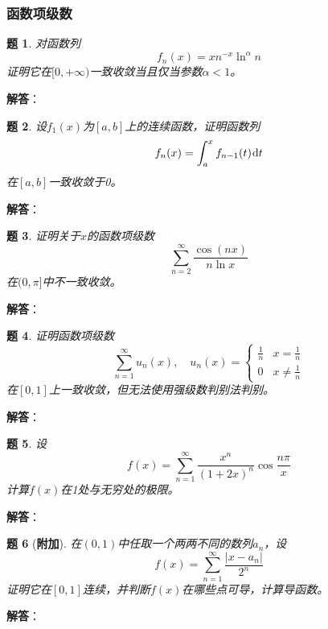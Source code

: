 \documentclass[a4paper,UTF8,fontset=windows,AutoFakeBold]{ctexart}
\newcommand*{\dr}{\hspace{0.07em}\mathrm{d}}
\newcommand*{\suminf}[1][n=1]{\sum_{#1}^\infty}
\newcommand*{\extra}{\textbf{附加}}
\theoremstyle{ex}
\newtheorem{exercise}{题}
\newcommand{\sol}[1]{{\vspace{5pt}\kaishu\noindent\textbf{解答}：\vspace{-3pt}
\begin{compactitem}
    \item[] #1
\end{compactitem}
}}
\begin{document}
\subsubsection{函数项级数}
\begin{framed}
\begin{exercise}
    对函数列
    $$f_n(x)=xn^{-x}\ln^\alpha n$$
    证明它在$[0,+\infty)$一致收敛当且仅当参数$\alpha<1$。
\end{exercise}
\sol{

}
\end{framed}

\begin{framed}
\begin{exercise}
    设$f_1(x)$为$[a,b]$上的连续函数，证明函数列
    $$f_n(x)=\int_a^xf_{n-1}(t)\dr t$$
    在$[a,b]$一致收敛于0。
\end{exercise}
\sol{

}
\end{framed}

\begin{framed}
\begin{exercise}
    证明关于$x$的函数项级数
    $$\suminf[n=2]\frac{\cos(nx)}{n\ln x}$$
    在$(0,\pi]$中不一致收敛。
\end{exercise}
\sol{

}
\end{framed}

\begin{framed}
\begin{exercise}
    证明函数项级数
    $$\suminf u_n(x),\quad u_n(x)=\begin{cases}\frac{1}{n}&x=\frac{1}{n}\\0&x\ne\frac{1}{n}\end{cases}$$
    在$[0,1]$上一致收敛，但无法使用强级数判别法判别。
\end{exercise}
\sol{

}
\end{framed}

\begin{framed}
\begin{exercise}
    设
    $$f(x)=\suminf\frac{x^n}{(1+2x)^n}\cos\frac{n\pi}{x}$$
    计算$f(x)$在1处与无穷处的极限。
\end{exercise}
\sol{

}
\end{framed}

\begin{framed}
\begin{exercise}[\extra]
    在$(0,1)$中任取一个两两不同的数列$a_n$，设
    $$f(x)=\suminf\frac{|x-a_n|}{2^n}$$
    证明它在$[0,1]$连续，并判断$f(x)$在哪些点可导，计算导函数。
\end{exercise}
\sol{

}
\end{framed}
\end{document}
